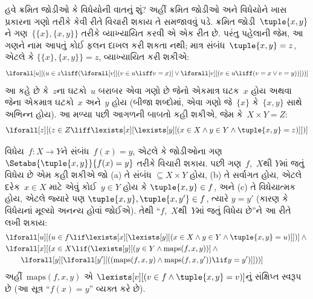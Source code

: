 હવે ક્રમિત જોડીઓ કે વિધેયોની વાતનું શું? અહીં ક્રમિત જોડીઓ અને
વિધેયોને ખાસ પ્રકારના ગણો તરીકે કેવી રીતે વિચારી શકાય તે સમજાવવું પડે.
ક્રમિત જોડી~$\tuple{x,y}$ને ગણ~$\{\{x\},\{x,y\}\}$ તરીકે વ્યાખ્યાયિત
કરવી એ એક રીત છે. પરંતુ પહેલાની જેમ, આ ગણને નામ આપતું કોઈ
ફલન દાખલ કરી શકતા નથી; માત્ર સંબંધ~$\tuple{x,y}=z$, એટલે કે
$\{\{x\},\{x,y\}\}=z$, વ્યાખ્યાયિત કરી શકીએ:
\[
\lforall[u][(u \in z \liff (\lforall[v][(v \in u \liff v = x)] \lor
  \lforall[v][(v \in u \liff (v = x \lor v = y))]))]
\]
આ કહે છે કે~$z$ના ઘટકો~$u$ બરાબર એવા ગણો છે જેનો એકમાત્ર
ઘટક~$x$ હોય અથવા જેના એકમાત્ર ઘટકો~$x$ અને~$y$ હોય
(બીજા શબ્દોમાં, એવા ગણો જે~$\{x\}$ કે~$\{x,y\}$ સાથે અભિન્ન હોય).
આ મળ્યા પછી આગળની બાબતો કહી શકીએ, જેમ કે~$X\times Y=Z$:
\[
\lforall[z][(z \in Z \liff \lexists[x][\lexists[y][(x \in
        X \land y \in Y \land \tuple{x, y} = z)]])]
\]

વિધેય~$f\colon X\to Y$ને સંબંધ~$f(x)=y$, એટલે કે જોડીઓના ગણ
$\Setabs{\tuple{x,y}}{f(x)=y}$ તરીકે વિચારી શકાય. પછી ગણ~$f$,~$X$થી
$Y$માં જતું વિધેય છે એમ કહી શકીએ જો (a) તે સંબંધ
$\subseteq X\times Y$ હોય, (b) તે સર્વાગત હોય, એટલે દરેક~$x\in X$
માટે એવું કોઈ~$y\in Y$ હોય કે $\tuple{x,y}\in f$, અને (c) તે
વિધેયાત્મક હોય, એટલે જ્યારે પણ
$\tuple{x,y},\tuple{x,y'}\in f$, ત્યારે $y=y'$ (કારણ કે વિધેયનાં
મૂલ્યો અનન્ય હોવાં જોઈએ). તેથી ``$f$,~$X$થી~$Y$માં જતું વિધેય છે''ને
આ રીતે લખી શકાય:
\begin{align*}
& \lforall[u][(u \in f \lif
   \lexists[x][\lexists[y][(x \in X \land y \in
      Y \land \tuple{x, y} = u)]])] \land {}\\
& \lforall[x][(x \in X \lif
   (\lexists[y][(y \in Y \land \mathrm{maps}(f, x, y))] \land {}\\
&\qquad \lforall[y][\lforall[y'][((\mathrm{maps}(f, x, y) \land
    \mathrm{maps}(f, x, y')) \lif y = y')]]))]
\end{align*}
અહીં~$\mathrm{maps}(f,x,y)$ એ
$\lexists[v][(v\in f\land\tuple{x,y}=v)]$નું સંક્ષિપ્ત સ્વરૂપ છે (આ
સૂત્ર ``$f(x)=y$'' વ્યક્ત કરે છે).


